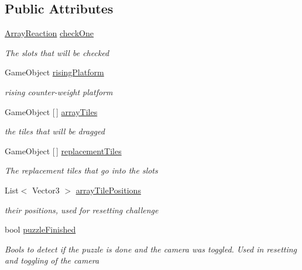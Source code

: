 \subsection*{Public Attributes}
\begin{DoxyCompactItemize}
\item 
\hyperlink{class_array_reaction}{Array\+Reaction} \hyperlink{class_array_sum_completion_ac76237e402fcc0e49a59a6e87c5def61}{check\+One}
\begin{DoxyCompactList}\small\item\em The slots that will be checked \end{DoxyCompactList}\item 
Game\+Object \hyperlink{class_array_sum_completion_aede79dd24168cb27103df95c78a78abf}{rising\+Platform}
\begin{DoxyCompactList}\small\item\em rising counter-\/weight platform \end{DoxyCompactList}\item 
Game\+Object \mbox{[}$\,$\mbox{]} \hyperlink{class_array_sum_completion_a18c8b02ee9ab7e991e7e49e97540794b}{array\+Tiles}
\begin{DoxyCompactList}\small\item\em the tiles that will be dragged \end{DoxyCompactList}\item 
Game\+Object \mbox{[}$\,$\mbox{]} \hyperlink{class_array_sum_completion_a51878c1ec6f821a4d7adff431b4143d1}{replacement\+Tiles}
\begin{DoxyCompactList}\small\item\em The replacement tiles that go into the slots \end{DoxyCompactList}\item 
List$<$ Vector3 $>$ \hyperlink{class_array_sum_completion_a48661584c0748edee316371617b45b5d}{array\+Tile\+Positions}
\begin{DoxyCompactList}\small\item\em their positions, used for resetting challenge \end{DoxyCompactList}\item 
bool \hyperlink{class_array_sum_completion_acbefffe0c43bbd4cd21cfcf34e0a9b7c}{puzzle\+Finished}
\begin{DoxyCompactList}\small\item\em Bools to detect if the puzzle is done and the camera was toggled. Used in resetting and toggling of the camera \end{DoxyCompactList}\end{DoxyCompactItemize}


